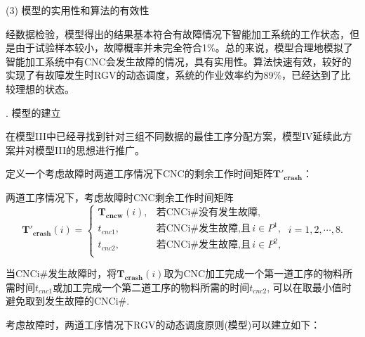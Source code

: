 \documentclass[no-math,withoutpreface,bwprint]{cumcmthesis} %
\numberwithin{equation}{section}
\numberwithin{figure}{section}
\numberwithin{table}{section}
\begin{document}
\noindent(3) 模型的实用性和算法的有效性

经数据检验，模型得出的结果基本符合有故障情况下智能加工系统的工作状态，但是由于试验样本较小，故障概率并未完全符合1\%。总的来说，模型合理地模拟了智能加工系统中有CNC会发生故障的情况，具有实用性。算法快速有效，较好的实现了有故障发生时RGV的动态调度，系统的作业效率约为89\%，已经达到了比较理想的状态。


. 模型的建立

在模型III中已经寻找到针对三组不同数据的最佳工序分配方案，模型IV延续此方案并对模型III的思想进行推广。

定义一个考虑故障时两道工序情况下CNC的剩余工作时间矩阵$\mathbf{T'_{crash}}$：

\begin{definition}
两道工序情况下，考虑故障时CNC剩余工作时间矩阵
\begin{equation}
\mathbf{T'_{crash}}(i)=\left\{\begin{array}{ll}
\mathbf{T_{cncw}}(i),&\text{若CNCi\#没有发生故障,}\\
t_{cnc1},&\text{若CNCi\#发生故障,且}\,i\in P^1,\\
t_{cnc2},&\text{若CNCi\#发生故障,且}\,i\in P^2,\\
\end{array}\right.
\ i=1,2,\cdots,8.
\end{equation}

当CNCi\#发生故障时，将$\mathbf{T_{crash}}(i)$取为CNC加工完成一个第一道工序的物料所需时间$t_{cnc1}$或加工完成一个第二道工序的物料所需的时间$t_{cnc2}$, 可以在取最小值时避免取到发生故障的CNCi\#.
\end{definition}

考虑故障时，两道工序情况下RGV的动态调度原则(模型)可以建立如下：
\end{document}
